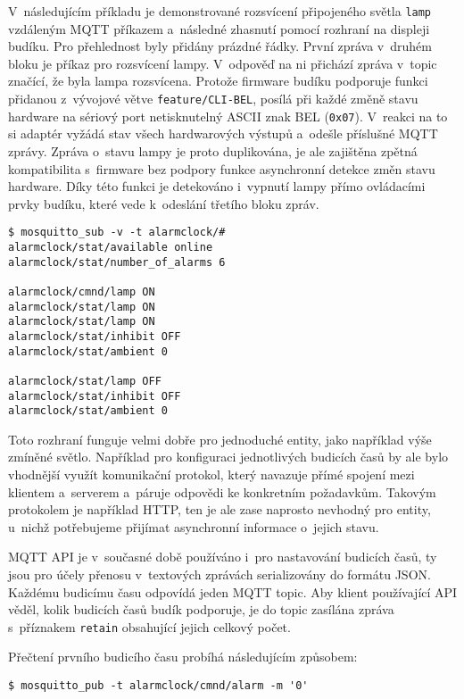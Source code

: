 V~následujícím příkladu je demonstrované rozsvícení připojeného světla
\texttt{lamp} vzdáleným MQTT příkazem a~následné zhasnutí pomocí rozhraní na
displeji budíku. Pro přehlednost byly přidány prázdné řádky. První zpráva
v~druhém bloku je příkaz pro rozsvícení lampy. V~odpověď na ni přichází zpráva
v~topic  značící, že byla lampa rozsvícena. Protože
firmware budíku podporuje funkci přidanou z~vývojové větve
\texttt{feature/CLI-BEL}, posílá při každé změně stavu hardware na sériový port
netisknutelný ASCII znak BEL (\texttt{0x07}). V~reakci na to si adaptér vyžádá
stav všech hardwarových výstupů a~odešle příslušné MQTT zprávy. Zpráva o~stavu
lampy je proto duplikována, je ale zajištěna zpětná kompatibilita s~firmware
bez podpory funkce asynchronní detekce změn stavu hardware.
Díky této funkci je detekováno i~vypnutí lampy přímo ovládacími prvky budíku,
které vede k~odeslání třetího bloku zpráv.
\begin{lstlisting}[style=terminal]
$ mosquitto_sub -v -t alarmclock/#
alarmclock/stat/available online
alarmclock/stat/number_of_alarms 6

alarmclock/cmnd/lamp ON
alarmclock/stat/lamp ON
alarmclock/stat/lamp ON
alarmclock/stat/inhibit OFF
alarmclock/stat/ambient 0

alarmclock/stat/lamp OFF
alarmclock/stat/inhibit OFF
alarmclock/stat/ambient 0
\end{lstlisting}

Toto rozhraní funguje velmi dobře pro jednoduché entity, jako například výše
zmíněné světlo. Například pro konfiguraci jednotlivých budicích časů by ale
bylo vhodnější využít komunikační protokol, který navazuje přímé spojení mezi
klientem a~serverem a~páruje odpovědi ke konkretním požadavkům. Takovým
protokolem je například HTTP, ten je ale zase naprosto nevhodný pro entity,
u~nichž potřebujeme přijímat asynchronní informace o~jejich stavu.

MQTT API je v~současné době používáno i~pro nastavování budicích časů, ty jsou
pro účely přenosu v~textových zprávách serializovány do formátu JSON.
Každému budicímu času odpovídá jeden MQTT topic. Aby klient používající API
věděl, kolik budicích časů budík podporuje, je do topic
 zasílána zpráva s~příznakem
\texttt{retain} obsahující jejich celkový počet.

Přečtení prvního budicího času probíhá následujícím způsobem:
\begin{lstlisting}[style=terminal]
$ mosquitto_pub -t alarmclock/cmnd/alarm -m '0'
\end{lstlisting}

